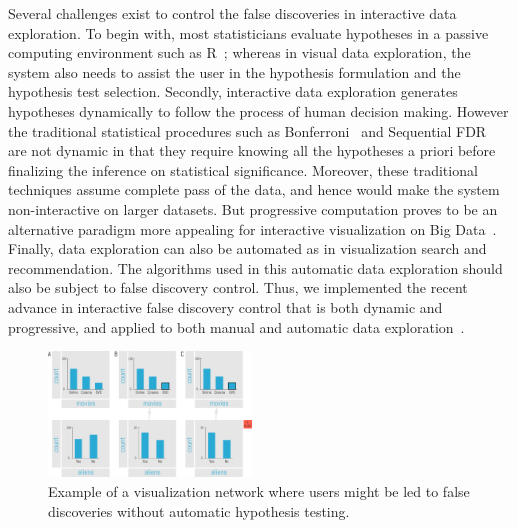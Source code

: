 Several challenges exist to control the false discoveries in interactive data exploration.  To begin with, most statisticians evaluate hypotheses in a passive computing environment such as R~\cite{R}; whereas in visual data exploration, the system also needs to assist the user in the hypothesis formulation and the hypothesis test selection. Secondly, interactive data exploration generates hypotheses dynamically to follow the process of human decision making.  However the traditional statistical procedures such as Bonferroni~\cite{bonferroni1936teoria} and Sequential FDR~\cite{g2016sequential} are not dynamic in that they require knowing all the hypotheses a priori before finalizing the inference on statistical significance.  Moreover, these traditional techniques assume complete pass of the data, and hence would make the system non-interactive on larger datasets.  But progressive computation proves to be an alternative paradigm more appealing for interactive visualization on Big Data~\cite{zgraggen2016progressive, onlineagg, vizdom}.  Finally, data exploration can also be automated as in visualization search and recommendation. The algorithms used in this automatic data exploration should also be subject to false discovery control.  Thus, we implemented the recent advance in interactive false discovery control that is both dynamic and progressive, and applied to both manual and automatic data exploration~\cite{zhao2016controlling}. 

\begin{figure}
\centering
\includegraphics[width=0.48\textwidth]{figures/example}
\caption{Example of a visualization network where users might be led to false discoveries without automatic hypothesis testing. }
\label{fig:example}	
\end{figure}